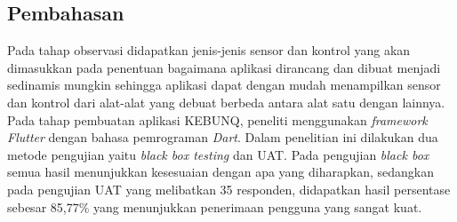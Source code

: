 \begin{flushleft}
\begin{justify}
   
        \section{Pembahasan}
        Pada tahap observasi didapatkan jenis-jenis sensor dan kontrol yang akan dimasukkan pada penentuan 
        bagaimana aplikasi dirancang dan dibuat menjadi sedinamis mungkin sehingga aplikasi dapat dengan mudah 
        menampilkan sensor dan kontrol dari alat-alat yang debuat berbeda antara alat satu dengan lainnya. 
        Pada tahap pembuatan aplikasi KEBUNQ, peneliti menggunakan \emph{framework Flutter} dengan bahasa 
        pemrograman \emph{Dart}. Dalam penelitian ini dilakukan dua metode pengujian yaitu \emph{black box testing} 
        dan UAT. Pada pengujian \emph{black box} semua hasil menunjukkan kesesuaian dengan apa yang diharapkan, 
        sedangkan pada pengujian UAT yang melibatkan 35 responden, didapatkan hasil persentase sebesar 85,77\% yang 
        menunjukkan penerimaan pengguna yang sangat kuat.
         

    








    \end{justify}




    
\end{flushleft}

\newpage